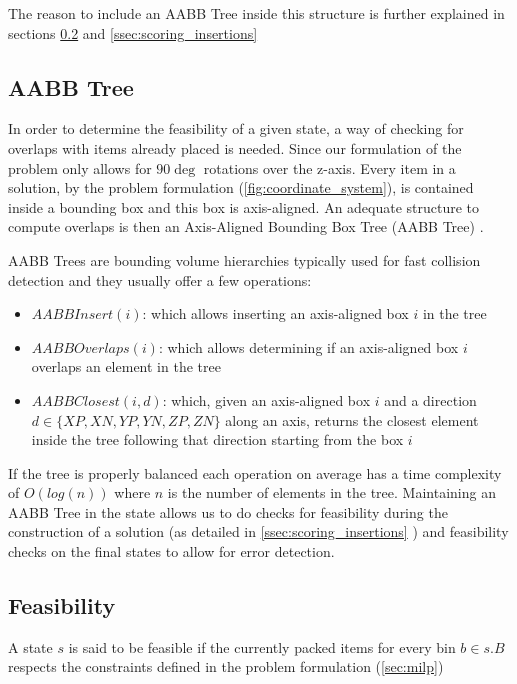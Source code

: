The reason to include an AABB Tree inside this structure is further explained in sections \ref{sec:problem_state:feasibility} and \ref{ssec:scoring_insertions}

\subsection{AABB Tree}
\label{sec:problem_state:aabbtree}%

In order to determine the feasibility of a given state, a way of checking for overlaps with items already placed is needed.
Since our formulation of the problem only allows for $90\deg$ rotations over the z-axis. Every item in a solution, by the problem formulation (\ref{fig:coordinate_system}), is contained inside a bounding box and this box is axis-aligned.
An adequate structure to compute overlaps is then an Axis-Aligned Bounding Box Tree (AABB Tree) \cite{bergen1997efficient}.

AABB Trees are bounding volume hierarchies typically used for fast collision detection and they usually offer a few operations:
\begin{itemize}
    \item $AABBInsert(i)$: which allows inserting an axis-aligned box $i$ in the tree
    \item $AABBOverlaps(i)$: which allows determining if an axis-aligned box $i$ overlaps an element in the tree
    \item $AABBClosest(i, d)$: which, given an axis-aligned box $i$ and a direction \\$d \in \{ XP, XN, YP, YN, ZP, ZN \}$ along an axis, returns the closest element inside the tree following that direction starting from the box $i$
\end{itemize}

If the tree is properly balanced each operation on average has a time complexity of $O(log(n))$ where $n$ is the number of elements in the tree.
Maintaining an AABB Tree in the state allows us to do checks for feasibility during the construction of a solution (as detailed in \ref{ssec:scoring_insertions} ) and feasibility checks on the final states to allow for error detection.

\subsection{Feasibility}
\label{sec:problem_state:feasibility}%
A state $s$ is said to be feasible if the currently packed items for every bin $b \in s.B$ respects the constraints defined in the problem formulation (\ref{sec:milp})

